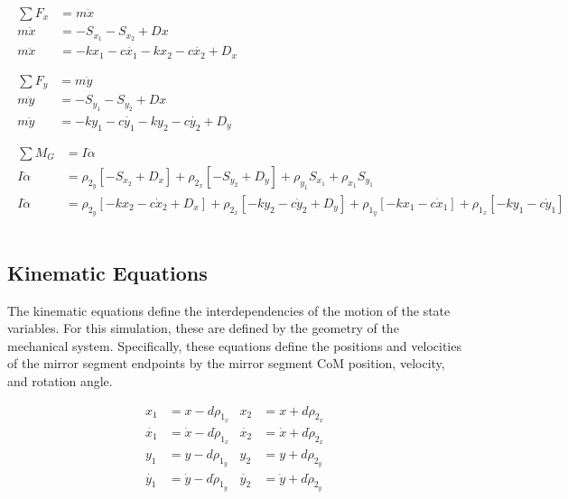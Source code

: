 \begin{subequations}
\label{eq:kinEQ}
\begin{align}
	\begin{split}
	\sum{F_x} &= m\ddot{x} \\
	m\ddot{x} &= -S_{x_1}-S_{x_2}+Dx \\
	m\ddot{x} &= -kx_1 - c\dot{x_1} - kx_2 - c\dot{x_2} + D_x \\
	\end{split}\\
	\begin{split}
	\sum{F_y} &= m\ddot{y}\\
	m\ddot{y} &= -S_{y_1}-S_{y_2}+Dx \\
	m\ddot{y} &= -ky_1 - c\dot{y_1} - ky_2 - c\dot{y_2} + D_y\\
	\end{split}\\
	\begin{split}
	\sum{M_G} &= I\ddot{\alpha}\\
	I\ddot{\alpha} &= \rho_{2_y}\left[-S_{x_2}+D_x\right] +  \rho_{2_x}\left[-S_{y_2}+D_y\right] + \rho_{y_1}S_{x_1} + \rho_{x_1}S_{y_1}  \\
	I\ddot{\alpha} &= \rho_{2_y}\left[-kx_2 - c\dot{x}_2+D_x\right] +  \rho_{2_x}\left[-ky_2 - c\dot{y}_2+D_y\right] + \rho_{1_y}\left[-kx_1 - c\dot{x}_1\right] + \rho_{1_x}\left[-ky_1 - c\dot{y}_1\right]  \\
	\end{split} \\ \nonumber
\end{align}
\end{subequations}

\subsection*{Kinematic Equations}

The kinematic equations define the interdependencies of the motion of the state variables. For this simulation, these are defined by the geometry of the mechanical system. Specifically, these equations define the positions and velocities of the mirror segment endpoints by the mirror segment CoM position, velocity, and rotation angle.

\begin{equation}
\label{eq:kinemEQ}
\begin{aligned}
		x_1 &= x - d\rho_{1_x} & x_2 &= x + d\rho_{2_x} \\
		\dot{x_1} &= \dot{x} - d\dot{\rho}_{1_x} & \dot{x_2} &= \dot{x} + d\dot{\rho}_{2_x} \\
		y_1 &= y - d\rho_{1_y} & y_2 &= y + d\rho_{2_y} \\
		\dot{y_1} &= \dot{y} - d\dot{\rho}_{1_y} & \dot{y_2} &= \dot{y} + d\dot{\rho}_{2_y}
\end{aligned}
\end{equation}


